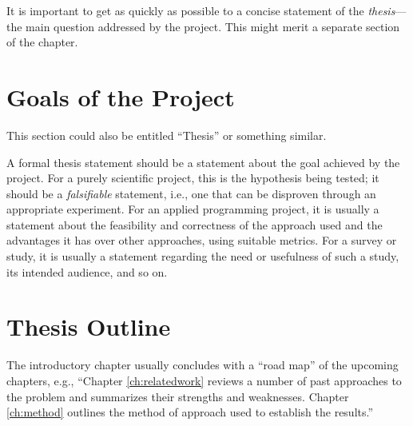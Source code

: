 It is important to get as quickly as possible to 
a concise statement of the {\it thesis}---the main question 
addressed by the project. This might merit a separate
section of the chapter.

\section{Goals of the Project}\label{sec:goals}
This section could also be entitled ``Thesis'' or something similar. 

A formal thesis statement should be a 
statement about 
the goal achieved by the project.  For a purely scientific
project, this is the hypothesis being tested; it should be a
\emph{falsifiable} statement, i.e., one that can be disproven through
an appropriate experiment.
For an applied programming project, it is usually a statement about 
the feasibility and correctness of the approach used and the advantages it 
has over other approaches, using suitable metrics.  For a survey or study,
it is usually a statement regarding the need 
or usefulness of such a study, its intended audience, and so on.


\section{Thesis Outline}\label{sec:outline}
The introductory chapter usually concludes with a ``road map'' of the upcoming
chapters, e.g., ``Chapter \ref{ch:relatedwork} reviews a number of past approaches
to the problem and summarizes their strengths and weaknesses. Chapter 
\ref{ch:method} outlines the method of approach used to establish the
results.''
